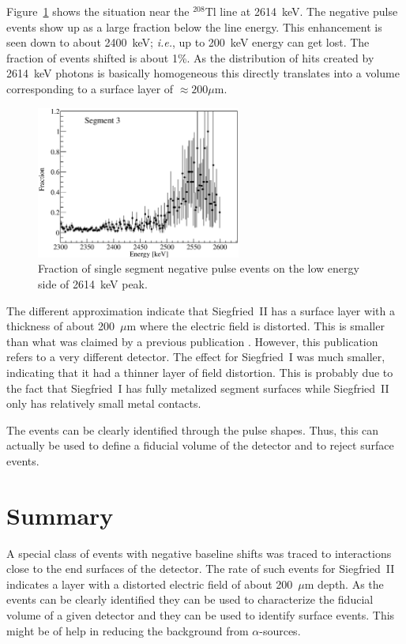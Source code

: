 Figure~\ref{fig:np:frac2614} shows the situation near the $^{208}$Tl
line at 2614~keV. The negative pulse events show up as a large fraction
below the line energy. This enhancement is seen down to about 2400~keV;
\textit{i.e.}, up to 200~keV energy can get lost. The fraction of
events shifted is about 1\%. As the distribution of hits created by
2614~keV photons is basically homogeneous this directly translates into
a volume corresponding to a surface layer of $\approx 200 \mu$m.

\begin{figure}[tphb]
\centering
\includegraphics[width=0.6\textwidth]{NegFraction2614}
\caption{Fraction of single segment negative pulse events on the low
energy side of 2614~keV peak.}
\label{fig:np:frac2614}
\end{figure}

The different approximation indicate that Siegfried~II has a surface
layer with a thickness of about 200~$\mu$m where the electric field is
distorted. This is smaller than what was claimed by a previous
publication \cite{Ebe08}. However, this publication refers to a very
different detector. The effect for Siegfried~I was much smaller,
indicating that it had a thinner layer of field distortion. This is
probably due to the fact that Siegfried~I has fully metalized segment
surfaces while Siegfried~II only has relatively small metal contacts.

The events can be clearly identified through the pulse shapes. Thus,
this can actually be used to define a fiducial volume of the detector
and to reject surface events.

\section{Summary}
\label{sec:np:sum}
A special class of events with negative baseline shifts was traced to
interactions close to the end surfaces of the detector. The rate of
such events for Siegfried~II indicates a layer with a distorted
electric field of about 200~$\mu$m depth. As the events can be clearly
identified they can be used to characterize the fiducial volume of a
given detector and they can be used to identify surface events. This
might be of help in reducing the background from $\alpha$-sources.

